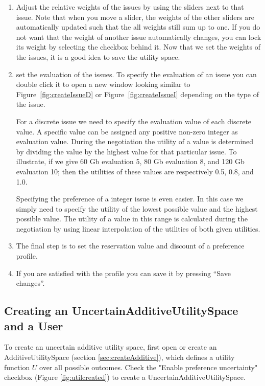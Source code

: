 \documentclass[]{llncs}
\begin{document}
\begin{enumerate}
\item Adjust the relative weights of the issues by using the sliders next to that issue. Note that when you move a slider, the weights of the other sliders are automatically updated such that the all weights still sum up to one. If you do not want that the weight of another issue automatically changes, you can lock its weight by selecting the checkbox behind it. Now that we set the weights of the issues, it is a good idea to save the utility space.
\item set the evaluation of the issues. To specify the evaluation of an issue you can double click it to open a new window looking similar to Figure~\ref{fig:createIssueD} or Figure~\ref{fig:createIssueI} depending on the type of the issue.

For a discrete issue we need to specify the evaluation value of each discrete value. A specific value can be assigned any positive non-zero integer as evaluation value. During the negotiation the utility of a value is determined by dividing the value by the highest value for that particular issue. To illustrate, if we give 60 Gb evaluation 5, 80 Gb evaluation 8, and 120 Gb evaluation 10; then the utilities of these values are respectively 0.5, 0.8, and 1.0.

Specifying the preference of a integer issue is even easier. In this case we simply need to specify the utility of the lowest possible value and the highest possible value. The utility of a value in this range is calculated during the negotiation by using linear interpolation of the utilities of both given utilities.

\item The final step is to set the reservation value and discount of a preference profile. 

\item If you are satisfied with the profile you can save it by pressing ``Save changes''. 
\end{enumerate}

\subsection{Creating an UncertainAdditiveUtilitySpace and a User}

To create an uncertain additive utility space, first open or create an AdditiveUtilitySpace (section \ref{sec:createAdditive}), which defines a utility function $U$ over all possible outcomes. Check the "Enable preference uncertainty" checkbox  (Figure \ref{fig:utilcreated}) to create a UncertainAdditiveUtilitySpace. 
\end{document}
